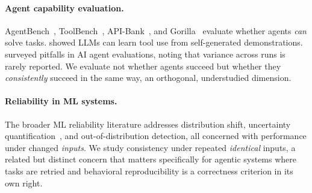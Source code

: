 \documentclass[11pt]{article}
\begin{document}
\paragraph{Agent capability evaluation.}
AgentBench~\citep{liu2023agentbench}, ToolBench~\citep{qin2023toolllm},
API-Bank~\citep{li2023apibank}, and Gorilla~\citep{patil2023gorilla} evaluate
whether agents \emph{can} solve tasks.
\citet{schick2023toolformer} showed LLMs can learn tool use from self-generated
demonstrations.
\citet{kapoor2024ai} surveyed pitfalls in AI agent evaluations, noting that
variance across runs is rarely reported.
We evaluate not whether agents succeed but whether they \emph{consistently} succeed
in the same way, an orthogonal, understudied dimension.

\paragraph{Reliability in ML systems.}
The broader ML reliability literature addresses distribution shift,
uncertainty quantification~\citep{lakshminarayanan2017simple}, and
out-of-distribution detection, all concerned with performance under changed
\emph{inputs}.
We study consistency under repeated \emph{identical} inputs, a related but distinct
concern that matters specifically for agentic systems where tasks are retried and
behavioral reproducibility is a correctness criterion in its own right.
\end{document}
